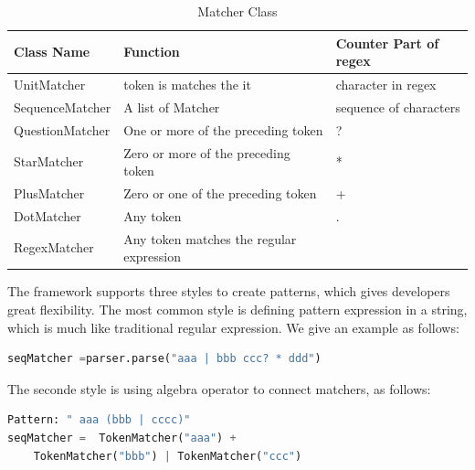 \begin{table}[ht]
\caption{Matcher Class } %
\centering %
\begin{tabular}{  | l | l | l |  }
 \hline
 Class Name        &  Function                                 & Counter Part of regex    \\
 \hline
 UnitMatcher       &  token is matches the it                  & character  in regex       \\
 \hline
 SequenceMatcher   &  A list of Matcher                        & sequence of characters       \\
  \hline
 QuestionMatcher   &  One or more of the preceding token       & ?       \\
  \hline
 StarMatcher       &  Zero or more of the preceding token      & *       \\
  \hline
 PlusMatcher       &  Zero or one of the preceding token       & +       \\
  \hline
 DotMatcher        &  Any token                                & .      \\
  \hline
 RegexMatcher      &  Any token matches the regular expression               &        \\
  \hline

\end{tabular}
\label{tab:matchers} %
\end{table}

The framework supports three styles to create patterns, which gives developers great flexibility. The most common style is defining pattern expression in a string, which is much like traditional regular expression. We give an example as follows:

\begin{framed}
\small
\begin{lstlisting}[language=Python]
seqMatcher =parser.parse("aaa | bbb ccc? * ddd")
\end{lstlisting}
\end{framed}

The seconde style is using algebra operator to connect matchers, as follows:
\begin{framed}
\small
\begin{lstlisting}[language=Python]
Pattern: " aaa (bbb | cccc)"
seqMatcher =  TokenMatcher("aaa") +
    TokenMatcher("bbb") | TokenMatcher("ccc")

\end{lstlisting}
\end{framed}

